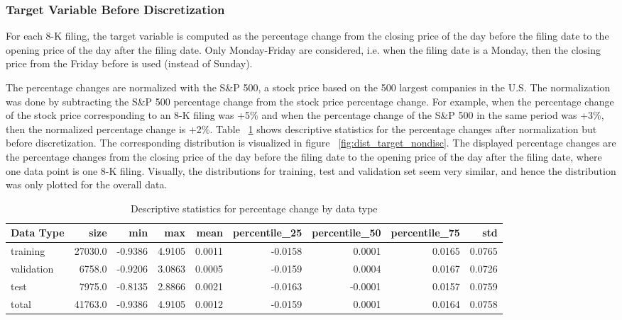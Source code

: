 \documentclass{article}
\begin{document}
	
	\subsubsection{Target Variable Before Discretization}
	
	For each 8-K filing, the target variable is computed as the percentage change from the closing price of the day before the filing date to the opening price of the day after the filing date. Only Monday-Friday are considered, i.e. when the filing date is a Monday, then the closing price from the Friday before is used (instead of Sunday). 
	
	The percentage changes are normalized with the S\&P 500, a stock price based on the 500 largest companies in the U.S. The normalization was done by subtracting the S\&P 500 percentage change from the stock price percentage change. For example, when the percentage change of the stock price corresponding to an 8-K filing was +5\% and when the percentage change of the S\&P 500 in the same period was +3\%, then the normalized percentage change is +2\%. Table ~\ref{table:stats_by_data} shows descriptive statistics for the percentage changes after normalization but before discretization. The corresponding distribution is visualized in figure ~\ref{fig:dist_target_nondisc}. The displayed percentage changes are the percentage changes from the closing price of the day before the filing date to the opening price of the day after the filing date, where one data point is one 8-K filing. Visually, the distributions for training, test and validation set seem very similar, and hence the distribution was only plotted for the overall data. 

	
	\begin{table}[h!]
		\centering
		\caption{Descriptive statistics for percentage change by data type}
		\label{table:stats_by_data}
		
		\begin{tabular}{lrrrrrrrr}
			\toprule
			Data Type &     size &     min &     max &    mean &  percentile\_25 &  percentile\_50 &  percentile\_75 &     std \\
			\midrule
			training   &  27030.0 & -0.9386 &  4.9105 &  0.0011 &        -0.0158 &         0.0001 &         0.0165 &  0.0765 \\
			validation &   6758.0 & -0.9206 &  3.0863 &  0.0005 &        -0.0159 &         0.0004 &         0.0167 &  0.0726 \\
			test       &   7975.0 & -0.8135 &  2.8866 &  0.0021 &        -0.0163 &        -0.0001 &         0.0157 &  0.0759 \\
			total      &  41763.0 & -0.9386 &  4.9105 &  0.0012 &        -0.0159 &         0.0001 &         0.0164 &  0.0758 \\
			\bottomrule
		\end{tabular}
		
	\end{table}%
	
\end{document}
